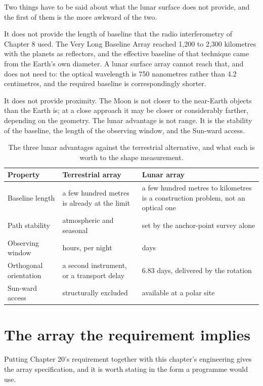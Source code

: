Two things have to be said about what the lunar surface does not provide,
and the first of them is the more awkward of the two.

It does not provide the length of baseline that the radio interferometry of
Chapter 8 used. The Very Long Baseline Array reached 1,200 to 2,300
kilometres with the planets as reflectors, and the effective baseline of
that technique came from the Earth's own diameter. A lunar surface array
cannot reach that, and does not need to: the optical wavelength is 750
nanometres rather than 4.2 centimetres, and the required baseline is
correspondingly shorter.

It does not provide proximity. The Moon is not closer to the near-Earth
objects than the Earth is; at a close approach it may be closer or
considerably farther, depending on the geometry. The lunar advantage is
not range. It is the stability of the baseline, the length of the observing
window, and the Sun-ward access.

\begin{table}[!htbp]
\centering
\small
\caption{The three lunar advantages against the terrestrial alternative, and
what each is worth to the shape measurement.}
\label{tab:baseline-compare}
\begin{tabularx}{\textwidth}{@{}P{1.22in}P{1.34in}Y@{}}
\toprule
{}
\textbf{Property} & \textbf{Terrestrial array} & \textbf{Lunar array} \\
\midrule
Baseline length & a few hundred metres is already at the limit & a few
hundred metres to kilometres is a construction problem, not an optical one \\
Path stability & atmospheric and seasonal & set by the anchor-point survey
alone \\
Observing window & hours, per night & days \\
Orthogonal orientation & a second instrument, or a transport delay & 6.83
days, delivered by the rotation \\
Sun-ward access & structurally excluded & available at a polar site \\
\bottomrule
\end{tabularx}
\end{table}

\section{The array the requirement implies}

Putting Chapter 20's requirement together with this chapter's engineering
gives the array specification, and it is worth stating in the form a
programme would use.

